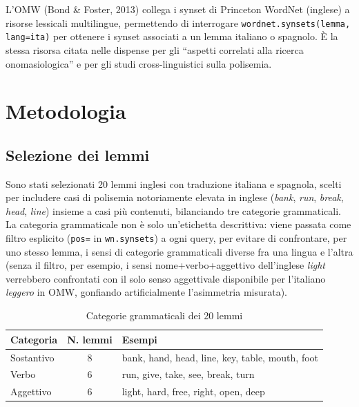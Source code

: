 \documentclass[12pt,a4paper]{article}
\begin{document}
L'OMW (Bond \& Foster, 2013) collega i synset di Princeton WordNet (inglese) a risorse lessicali multilingue, permettendo di interrogare \texttt{wordnet.synsets(lemma, lang=\textquotesingle ita\textquotesingle)} per ottenere i synset associati a un lemma italiano o spagnolo. \`E la stessa risorsa citata nelle dispense per gli ``aspetti correlati alla ricerca onomasiologica'' e per gli studi cross-linguistici sulla polisemia.

\section{Metodologia}

\subsection{Selezione dei lemmi}

Sono stati selezionati 20 lemmi inglesi con traduzione italiana e spagnola, scelti per includere casi di polisemia notoriamente elevata in inglese (\textit{bank}, \textit{run}, \textit{break}, \textit{head}, \textit{line}) insieme a casi pi\`u contenuti, bilanciando tre categorie grammaticali. La categoria grammaticale non \`e solo un'etichetta descrittiva: viene passata come filtro esplicito (\texttt{pos=} in \texttt{wn.synsets}) a ogni query, per evitare di confrontare, per uno stesso lemma, i sensi di categorie grammaticali diverse fra una lingua e l'altra (senza il filtro, per esempio, i sensi nome+verbo+aggettivo dell'inglese \textit{light} verrebbero confrontati con il solo senso aggettivale disponibile per l'italiano \textit{leggero} in OMW, gonfiando artificialmente l'asimmetria misurata).

\begin{table}[H]
  \centering
  \caption{Categorie grammaticali dei 20 lemmi}
  \begin{tabular}{lcl}
    \toprule
    \textbf{Categoria} & \textbf{N. lemmi} & \textbf{Esempi} \\
    \midrule
    Sostantivo & 8 & bank, hand, head, line, key, table, mouth, foot \\
    Verbo      & 6 & run, give, take, see, break, turn \\
    Aggettivo  & 6 & light, hard, free, right, open, deep \\
    \bottomrule
  \end{tabular}
\end{table}
\end{document}
